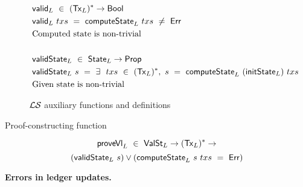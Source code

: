 \begin{figure*}[htb]
\begin{align*}
    & \mathsf{valid}_L ~\in~ (\mathsf{Tx}_L)^{*} \to \mathsf{Bool} \\
    & \mathsf{valid}_L~txs~ = ~\mathsf{computeState}_L ~txs~ \neq ~\mathsf{Err} \\
    & \text{Computed state is non-trivial} \\~\\
    & \mathsf{validState}_L ~\in~ \mathsf{State}_L \to \mathsf{Prop} \\
    & \mathsf{validState}_L~s~ = ~\exists~~txs~\in~(\mathsf{Tx}_L)^{*},~
      s~=~\mathsf{computeState}_L~(\mathsf{initState}_L) ~txs \\
    & \text{Given state is non-trivial}
  \end{align*}
  \caption{$\mathcal{L}\mathcal{S}$ auxiliary functions and definitions}
  \label{fig:ledger-aux}
\end{figure*}

Proof-constructing function

\[\mathsf{proveVl}_L ~\in~ \mathsf{ValSt}_L \to (\mathsf{Tx}_L)^{*} \to \]
\[ (\mathsf{validState}_L~s) \vee (\mathsf{computeState}_L~s~txs~=~\mathsf{Err})\]



\textbf{Errors in ledger updates.}

